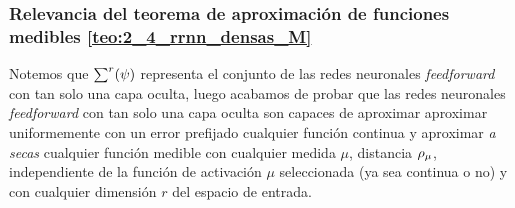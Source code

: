 \subsubsection{Relevancia del teorema de aproximación de funciones medibles \ref{teo:2_4_rrnn_densas_M}}

Notemos que  $\sum^r (\psi)$ representa el conjunto de 
las redes neuronales \textit{feedforward} con tan solo una capa oculta, luego 
acabamos de probar que las redes neuronales \textit{feedforward} con 
tan solo una capa oculta son capaces de aproximar 
aproximar uniformemente con un error prefijado
cualquier función continua y aproximar \textit{a secas} cualquier
función medible 
con cualquier medida $\mu$, distancia $\rho_{\mu}$, independiente de la 
función de activación $\mu$ seleccionada (ya sea continua o no) 
y con cualquier dimensión $r$ del espacio de entrada. 

 
